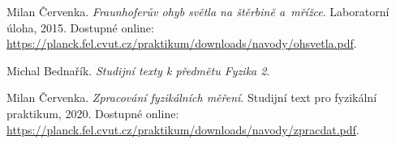\documentclass[a4paper,12pt]{article}
\begin{document}
\begin{thebibliography}{}

    Milan Červenka. \textit{Fraunhoferův ohyb světla na štěrbině a~mřížce}. Laboratorní úloha, 2015. Dostupné online: \url{https://planck.fel.cvut.cz/praktikum/downloads/navody/ohsvetla.pdf}.

    Michal Bednařík. \textit{Studijní texty k předmětu Fyzika 2}.
    
    Milan Červenka. \textit{Zpracování fyzikálních měření}. Studijní text pro fyzikální praktikum, 2020. Dostupné online: \url{https://planck.fel.cvut.cz/praktikum/downloads/navody/zpracdat.pdf}.

\end{thebibliography}
\end{document}
